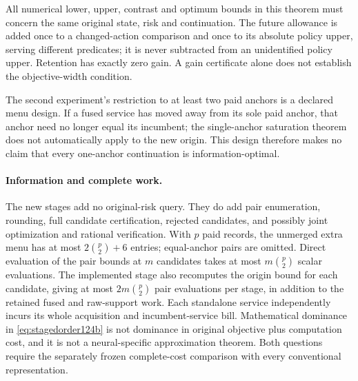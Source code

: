 All numerical lower, upper, contrast and optimum bounds in this
theorem must concern the same original state, risk and continuation.
The future allowance is added once to a changed-action comparison
and once to its absolute policy upper, serving different predicates;
it is never subtracted from an unidentified policy upper. Retention
has exactly zero gain. A gain certificate alone does not establish
the objective-width condition.

The second experiment's restriction to at least two paid anchors is
a declared menu design. If a fused service has moved away from its
sole paid anchor, that anchor need no longer equal its incumbent;
the single-anchor saturation theorem does not automatically apply
to the new origin. This design therefore makes no claim that every
one-anchor continuation is information-optimal.

\paragraph{Information and complete work.}
The new stages add no original-risk query. They do add pair enumeration,
rounding, full candidate certification, rejected candidates, and
possibly joint optimization and rational verification. With $p$ paid
records, the unmerged extra menu has at most $2\binom p2+6$ entries;
equal-anchor pairs are omitted. Direct evaluation of the pair bounds
at $m$ candidates takes at most $m\binom p2$ scalar evaluations.
The implemented stage also recomputes the origin bound for each
candidate, giving at most $2m\binom p2$ pair evaluations per stage,
in addition to the retained fused and raw-support work. Each
standalone service independently incurs its whole acquisition and
incumbent-service bill. Mathematical dominance in
\eqref{eq:stagedorder124b} is not dominance in original objective
plus computation cost, and it is not a neural-specific approximation
theorem. Both questions require the separately frozen complete-cost
comparison with every conventional representation.
